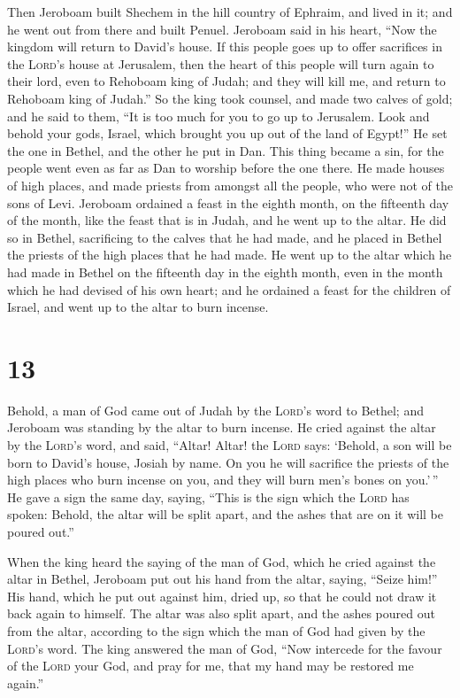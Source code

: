  Then Jeroboam built Shechem in the hill country of
Ephraim, and lived in it; and he went out from there and built Penuel.
 Jeroboam said in his heart, ``Now the kingdom will
return to David's house.  If this people goes up to offer
sacrifices in the \textsc{Lord}'s house at Jerusalem, then the heart of
this people will turn again to their lord, even to Rehoboam king of
Judah; and they will kill me, and return to Rehoboam king of Judah.''
 So the king took counsel, and made two calves of gold;
and he said to them, ``It is too much for you to go up to Jerusalem.
Look and behold your gods, Israel, which brought you up out of the land
of Egypt!''  He set the one in Bethel, and the other he
put in Dan.  This thing became a sin, for the people went
even as far as Dan to worship before the one there.  He
made houses of high places, and made priests from amongst all the
people, who were not of the sons of Levi.  Jeroboam
ordained a feast in the eighth month, on the fifteenth day of the month,
like the feast that is in Judah, and he went up to the altar. He did so
in Bethel, sacrificing to the calves that he had made, and he placed in
Bethel the priests of the high places that he had made. 
He went up to the altar which he had made in Bethel on the fifteenth day
in the eighth month, even in the month which he had devised of his own
heart; and he ordained a feast for the children of Israel, and went up
to the altar to burn incense.

\hypertarget{section-12}{%
\section{13}\label{section-12}}

 Behold, a man of God came out of Judah by the
\textsc{Lord}'s word to Bethel; and Jeroboam was standing by the altar
to burn incense.  He cried against the altar by the
\textsc{Lord}'s word, and said, ``Altar! Altar! the \textsc{Lord} says:
`Behold, a son will be born to David's house, Josiah by name. On you he
will sacrifice the priests of the high places who burn incense on you,
and they will burn men's bones on you.'\,''  He gave a
sign the same day, saying, ``This is the sign which the \textsc{Lord}
has spoken: Behold, the altar will be split apart, and the ashes that
are on it will be poured out.''

 When the king heard the saying of the man of God, which
he cried against the altar in Bethel, Jeroboam put out his hand from the
altar, saying, ``Seize him!'' His hand, which he put out against him,
dried up, so that he could not draw it back again to himself.
 The altar was also split apart, and the ashes poured out
from the altar, according to the sign which the man of God had given by
the \textsc{Lord}'s word.  The king answered the man of
God, ``Now intercede for the favour of the \textsc{Lord} your God, and
pray for me, that my hand may be restored me again.''

